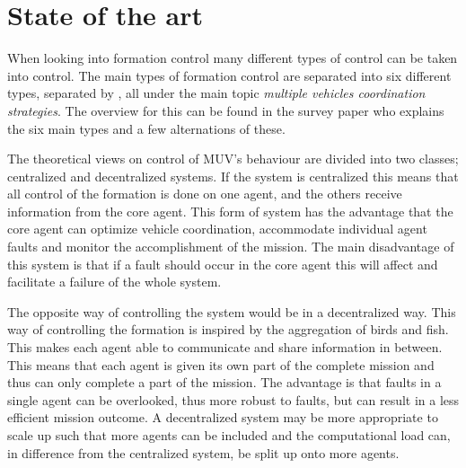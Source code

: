 \section{State of the art}
When looking into formation control many different types of control can be taken into control. The main types of formation control are separated into six different types, separated by \cite{muv-survey}, all under the main topic \textit{multiple vehicles coordination strategies}. The overview for this can be found in the survey paper \cite{muv-survey} who explains the six main types and a few alternations of these.

The theoretical views on control of \ac{MUV}'s behaviour are divided into two classes; centralized and decentralized systems. If the system is centralized this means that all control of the formation is done on one agent, and the others receive information from the core agent. This form of system has the advantage that the core agent can optimize vehicle coordination, accommodate individual agent faults and monitor the accomplishment of the mission. The main disadvantage of this system is that if a fault should occur in the core agent this will affect and facilitate a failure of the whole system.

The opposite way of controlling the system would be in a decentralized way. This way of controlling the formation is inspired by the aggregation of birds and fish. This makes each agent able to communicate and share information in between. This means that each agent is given its own part of the complete mission and thus can only complete a part of the mission. The advantage is that faults in a single agent can be overlooked, thus more robust to faults, but can result in a less efficient mission outcome. A decentralized system may be more appropriate to scale up such that more agents can be included and the computational load can, in difference from the centralized system, be split up onto more agents.

